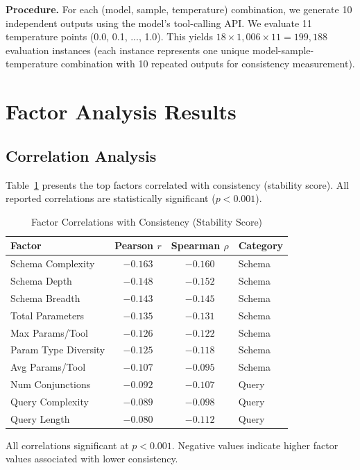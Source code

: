 \documentclass[sigconf,anonymous,review]{acmart}
\begin{document}
\textbf{Procedure.} For each (model, sample, temperature) combination, we generate 10 independent outputs using the model's tool-calling API. We evaluate 11 temperature points (0.0, 0.1, ..., 1.0). This yields $18 \times 1{,}006 \times 11 = 199{,}188$ evaluation instances (each instance represents one unique model-sample-temperature combination with 10 repeated outputs for consistency measurement).

\section{Factor Analysis Results}
\label{sec:results}

\subsection{Correlation Analysis}

Table~\ref{tab:correlations} presents the top factors correlated with consistency (stability score). All reported correlations are statistically significant ($p < 0.001$).

\begin{table}[t]
\centering
\caption{Factor Correlations with Consistency (Stability Score)}
\label{tab:correlations}
\small
\begin{tabular}{@{}lccl@{}}
\toprule
\textbf{Factor} & \textbf{Pearson $r$} & \textbf{Spearman $\rho$} & \textbf{Category} \\
\midrule
Schema Complexity & $-0.163$ & $-0.160$ & Schema \\
Schema Depth & $-0.148$ & $-0.152$ & Schema \\
Schema Breadth & $-0.143$ & $-0.145$ & Schema \\
Total Parameters & $-0.135$ & $-0.131$ & Schema \\
Max Params/Tool & $-0.126$ & $-0.122$ & Schema \\
Param Type Diversity & $-0.125$ & $-0.118$ & Schema \\
Avg Params/Tool & $-0.107$ & $-0.095$ & Schema \\
Num Conjunctions & $-0.092$ & $-0.107$ & Query \\
Query Complexity & $-0.089$ & $-0.098$ & Query \\
Query Length & $-0.080$ & $-0.112$ & Query \\
\bottomrule
\end{tabular}
\vspace{0.5em}

\raggedright\footnotesize All correlations significant at $p < 0.001$. Negative values indicate higher factor values associated with lower consistency.
\end{table}
\end{document}
